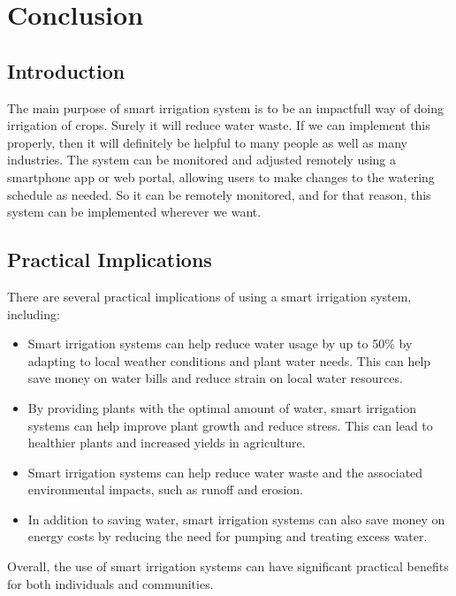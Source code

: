 \documentclass{report}
\begin{document}
\chapter{Conclusion}
\section{Introduction}
The main purpose of smart irrigation system is to be an impactfull way of doing irrigation of crops. Surely it will reduce water waste. If we can implement this properly, then it will definitely be helpful to many people as well as many industries. The system can be monitored and adjusted remotely using a smartphone app or web portal, allowing users to make changes to the watering schedule as needed. So it can be remotely monitored, and for that reason, this system can be implemented wherever we want.
\section{Practical Implications}
There are several practical implications of using a smart irrigation system, including:\\
\begin{itemize}
    \item Smart irrigation systems can help reduce water usage by up to 50{\%} by adapting to local weather conditions and plant water needs. This can help save money on water bills and reduce strain on local water resources.
    \item By providing plants with the optimal amount of water, smart irrigation systems can help improve plant growth and reduce stress. This can lead to healthier plants and increased yields in agriculture.
    \item Smart irrigation systems can help reduce water waste and the associated environmental impacts, such as runoff and erosion.
    \item In addition to saving water, smart irrigation systems can also save money on energy costs by reducing the need for pumping and treating excess water.
\end{itemize}
Overall, the use of smart irrigation systems can have significant practical benefits for both individuals and communities.\\
\end{document}
